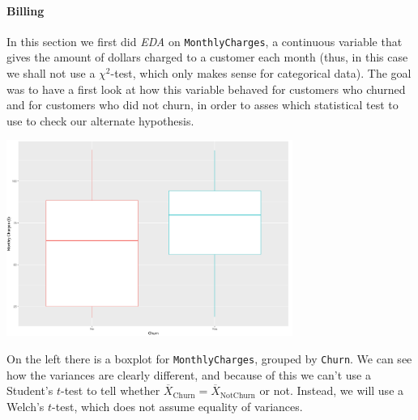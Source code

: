 \documentclass[man, floatsintext]{apa6}
\begin{document}
\paragraph{Billing}

In this section we first did \textit{EDA} on \texttt{MonthlyCharges}, a continuous variable that gives the amount of dollars charged to a customer each month (thus, in this case we shall not use a $\chi^2$-test, which only makes sense for categorical data). The goal was to have a first look at how this variable behaved for customers who churned and for customers who did not churn, in order to asses which statistical test to use to check our alternate hypothesis. 


\noindent\begin{minipage}{0.54\textwidth}
\includegraphics[width = \linewidth, height = 64mm]{boxplot_MonthlyChargesvsChurn}
\end{minipage}
\hfill
\begin{minipage}{0.43\textwidth} On the left there is a boxplot for \texttt{MonthlyCharges}, grouped by \texttt{Churn}. We can see how the variances are clearly different, and because of this we can't use a Student's $t$-test to tell whether $\overline{X}_{\text{Churn}} = \overline{X}_{\text{NotChurn}}$ or not. Instead, we will use a Welch's $t$-test, which does not assume equality of variances. 
\end{minipage}
\end{document}
